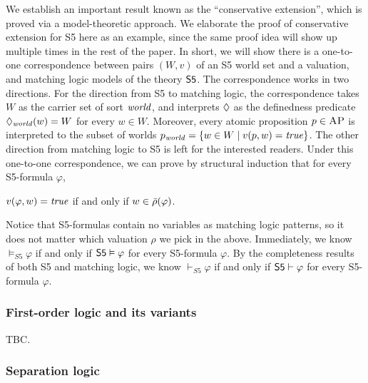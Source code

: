 \documentclass{amsart}
\begin{document}
We establish an important result known as the ``conservative extension'',
which is proved via a model-theoretic approach.
We elaborate the proof of conservative extension for S5 here as an example,
since the same proof idea will show up multiple times in the rest of the paper.
In short, we will show there is a one-to-one correspondence between
pairs $(W,v)$ of an S5 world set and a valuation, 
and matching logic models of the theory $\mathsf{S5}$.
The correspondence works in two directions.
For the direction from S5 to matching logic,
the correspondence takes $W$ as the carrier set of sort $\mathit{world}$,
and interprets ${\lozenge}$ as the definedness predicate
${\lozenge}_{\mathit{world}} (w) = W$ for every $w \in W$.
Moreover, every atomic proposition $p \in \textsc{AP}$ is interpreted to
the subset of worlds $p_{\mathit{world}} = \{ w \in W \mid v(p, w) = \mathit{true} \}$.
The other direction from matching logic to S5 is left for 
the interested readers.
Under this one-to-one correspondence, 
we can prove by structural induction that for every S5-formula $\varphi$,
\begin{center}
$v(\varphi, w) = \mathit{true}$
\quad if and only if \quad
$w \in \bar{\rho}(\varphi)$.
\end{center}
Notice that S5-formulas contain no variables as matching logic patterns,
so it does not matter which valuation $\rho$ we pick in the above.
Immediately, we know $\vDash_{S5} \varphi$ if and only if
$\mathsf{S5} \vDash \varphi$ for every S5-formula $\varphi$.
By the completeness results of both S5 and matching logic,
we know $\vdash_{S5} \varphi$ if and only if $\mathsf{S5} \vdash \varphi$
for every S5-formula $\varphi$.

\subsubsection{First-order logic and its variants}
TBC.

\subsubsection{Separation logic}
\label{sec_separation_logic}
\end{document}
